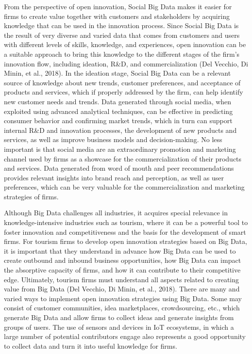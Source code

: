 \documentclass[
  letterpaper,
  DIV=11,
  numbers=noendperiod]{scrreprt}
\begin{document}
From the perspective of open innovation, Social Big Data makes it easier
for firms to create value together with customers and stakeholders by
acquiring knowledge that can be used in the innovation process. Since
Social Big Data is the result of very diverse and varied data that comes
from customers and users with different levels of skills, knowledge, and
experiences, open innovation can be a suitable approach to bring this
knowledge to the different stages of the firm's innovation flow,
including ideation, R\&D, and commercialization (Del Vecchio, Di Minin,
et al., 2018). In the ideation stage, Social Big Data can be a relevant
source of knowledge about new trends, customer preferences, and
acceptance of products and services, which if properly addressed by the
firm, can help identify new customer needs and trends. Data generated
through social media, when exploited using advanced analytical
techniques, can be effective in predicting consumer behavior and
confirming market trends, which in turn can support internal R\&D and
innovation processes, the development of new products and services, as
well as improve business models and decision-making. No less important
is that social media are an extraordinary promotion and marketing
channel used by firms as a showcase for the commercialization of their
products and services. Data generated from word of mouth and peer
recommendations provides relevant insights into brand reach and
perception, as well as user preferences, which can be very valuable for
the commercialization and marketing strategies of firms.

Although Big Data challenges all industries, it acquires special
relevance in knowledge-intensive industries such as tourism, where it
can be a powerful tool to foster innovation and competitiveness and the
basis for the development of smart firms. For tourism firms to develop
open innovation strategies based on Big Data, it is important that they
understand in advance how Big Data can be used to create outbound and
inbound business opportunities, how Big Data can impact the absorptive
capacity of firms, and how it can contribute to their competitive edge.
Ultimately, tourism firms must understand all aspects related to
creating value from Big Data (Del Vecchio, Di Minin, et al., 2018).
There are many and varied ways to implement open innovation strategies
using Big Data. Some may consist of customer communities, idea
marketplaces, crowdsourcing, etc., which generate Big Data and allow
firms to collect ideas and generate insights from groups of users. The
use of sensors and devices in IoT ecosystems, in which a large number of
potential contributors engage also represents a good opportunity to
collect data and turn it into useful knowledge for firms.
\end{document}
